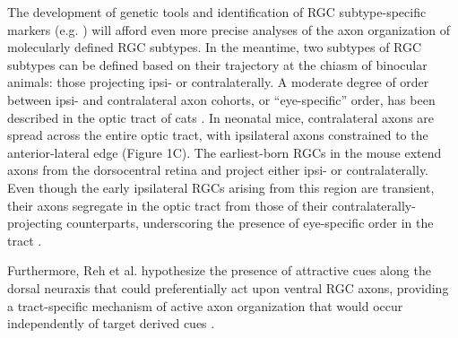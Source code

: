 The development of genetic tools and identification of RGC subtype-specific markers (e.g. \cite{blackshaw2004genomic,dhande2014retinal}) will afford even more precise analyses of the axon organization of molecularly defined RGC subtypes.
In the meantime, two subtypes of RGC subtypes can be defined based on their trajectory at the chiasm of binocular animals: those projecting ipsi- or contralaterally.
A moderate degree of order between ipsi- and contralateral axon cohorts, or “eye-specific” order, has been described in the optic tract of cats \cite{torrealba1982studies}.
In neonatal mice, contralateral axons are spread across the entire optic tract, with ipsilateral axons constrained to the anterior-lateral edge \cite{godement1984prenatal} (Figure 1C). %
The earliest-born RGCs in the mouse extend axons from the dorsocentral retina and project either ipsi- or contralaterally.
Even though the early ipsilateral RGCs arising from this region are transient, their axons segregate in the optic tract from those of their contralaterally-projecting counterparts, underscoring the presence of eye-specific order in the tract \cite{soares2015transient}.

Furthermore, Reh et al. hypothesize the presence of attractive cues along the dorsal neuraxis that could preferentially act upon ventral RGC axons, providing a tract-specific mechanism of active axon organization that would occur independently of target derived cues \cite{reh1983organization}.